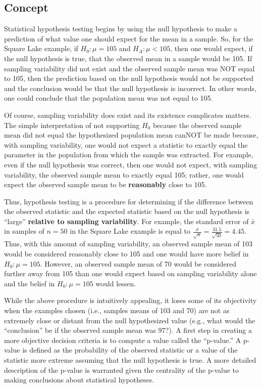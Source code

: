\documentclass[10pt,openany]{book}\usepackage[]{graphicx}\usepackage[]{color}
\begin{document}
\subsection{Concept}
Statistical hypothesis testing begins by using the null hypothesis to make a prediction of what value one should expect for the mean in a sample.  So, for the Square Lake example, if $H_{0}:\mu=105$ and $H_{A}:\mu<105$, then one would expect, if the null hypothesis is true, that the observed mean in a sample would be 105.  If sampling variability did not exist and the observed sample mean was NOT equal to 105, then the prediction based on the null hypothesis would not be supported and the conclusion would be that the null hypothesis is incorrect.  In other words, one could conclude that the population mean was not equal to 105.

Of course, sampling variability does exist and its existence complicates matters.  The simple interpretation of not supporting $H_{0}$ because the observed sample mean did not equal the hypothesized population mean canNOT be made because, with sampling variability, one would not expect a statistic to exactly equal the parameter in the population from which the sample was extracted.  For example, even if the null hypothesis was correct, then one would not expect, with sampling variability, the observed sample mean to exactly equal 105; rather, one would expect the observed sample mean to be \textbf{reasonably} close to 105.

Thus, hypothesis testing is a procedure for determining if the difference between the observed statistic and the expected statistic based on the null hypothesis is ``large'' \textbf{relative to sampling variability}.  For example, the standard error of $\bar{x}$ in samples of $n=50$ in the Square Lake example is equal to $\frac{\sigma}{\sqrt{n}}=$$\frac{31.5}{\sqrt{50}}$$=4.45$.  Thus, with this amount of sampling variability, an observed sample mean of 103 would be considered reasonably close to 105 and one would have more belief in $H_{0}:\mu=105$.  However, an observed sample mean of 70 would be considered further away from 105 than one would expect based on sampling variability alone and the belief in $H_{0}:\mu=105$ would lessen.

While the above procedure is intuitively appealing, it loses some of its objectivity when the examples chosen (i.e., samples means of 103 and 70) are not as extremely close or distant from the null hypothesized value (e.g., what would the ``conclusion'' be if the observed sample mean was 97?).  A first step in creating a more objective decision criteria is to compute a value called the ``p-value.''  A p-value is defined as the probability of the observed statistic or a value of the statistic more extreme assuming that the null hypothesis is true.  A more detailed description of the p-value is warranted given the centrality of the p-value to making conclusions about statistical hypotheses.
\end{document}

